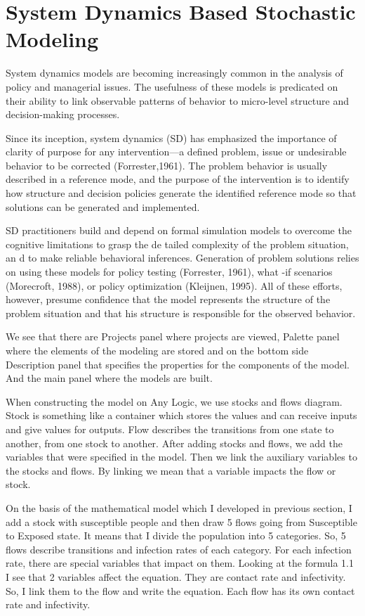 \section{System Dynamics Based Stochastic Modeling}

System dynamics models are becoming increasingly common in the analysis of policy and managerial issues. The usefulness of these models is predicated on their ability to link observable patterns of behavior to micro-level structure and decision-making processes.

Since its inception, system dynamics (SD) has emphasized the importance of clarity of purpose for any intervention––a defined problem, issue or undesirable behavior to be corrected (Forrester,1961). The problem behavior is usually described in a reference mode, and the purpose of the intervention is to identify how structure and decision policies generate the identified reference mode so that solutions can be generated and implemented.

SD practitioners build and depend on formal simulation models to overcome the cognitive limitations to grasp the de tailed complexity of the problem situation, an d to make reliable behavioral inferences. Generation of problem solutions relies on using these models for policy testing (Forrester, 1961), what -if scenarios (Morecroft, 1988), or policy optimization (Kleijnen, 1995). All of these efforts, however, presume confidence that the model represents the structure of the problem situation and that his structure is responsible for the observed behavior.

We see that there are Projects panel where projects are viewed, Palette panel where the elements of the modeling are stored and on the bottom side Description panel that specifies the properties for the components of the model. And the main panel where the models are built.

When constructing the model on Any Logic, we use stocks and flows diagram. Stock is something like a container which stores the values and can receive inputs and give values for outputs. Flow describes the transitions from one state to another, from one stock to another. After adding stocks and flows, we add the variables that were specified in the model. Then we link the auxiliary variables to the stocks and flows. By linking we mean that a variable impacts the flow or stock.


On the basis of the mathematical model which I developed in previous section, I add a stock with susceptible people and then draw 5 flows going from Susceptible to Exposed state.  It means that I divide the population into 5 categories. So, 5 flows describe transitions and infection rates of each category. For each infection rate, there are special variables that impact on them. Looking at the formula 1.1 I see that 2 variables affect the equation. They are contact rate and infectivity. So, I link them to the flow and write the equation. Each flow has its own contact rate and infectivity.

